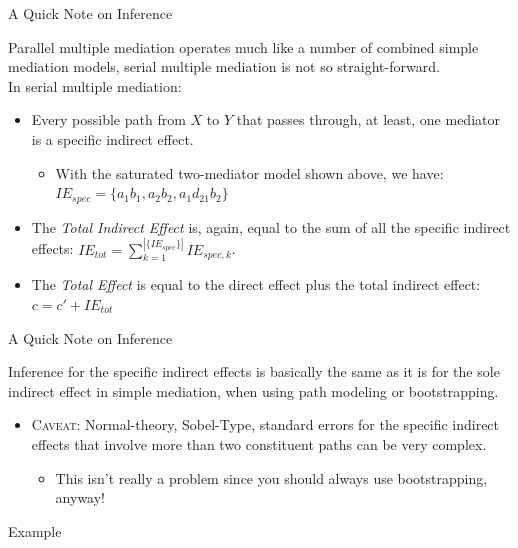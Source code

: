 \documentclass{beamer}
\newcommand{\va}[0]{\vspace{12pt}}
\newcommand{\vb}[0]{\vspace{6pt}}
\newcommand{\vc}[0]{\vspace{3pt}}
\begin{document}
\begin{frame}{A Quick Note on Inference}
  
  Parallel multiple mediation operates much like a number of combined
  simple mediation models, serial multiple mediation is not so
  straight-forward.\\ 
  \va 
  In serial multiple mediation: 
  \vb
  \begin{itemize}
  \item Every possible path from $X$ to $Y$ that passes through, at
    least, one mediator is a specific indirect effect.
    \begin{itemize}
      \item With the saturated two-mediator model shown above, we
        have: $IE_{spec} = \{a_1b_1, a_2b_2, a_1d_{21}b_2\}$
    \end{itemize}
    \vc
  \item The \emph{Total Indirect Effect} is, again, equal to the sum
    of all the specific indirect effects: $IE_{tot} = \sum_{k = 1}^{|\{IE_{spec}\}|}
    IE_{spec,k}$.  
    \vc
  \item The \emph{Total Effect} is equal to the direct effect plus the
    total indirect effect: $c = c' + IE_{tot}$
  \end{itemize}
  
\end{frame}


\begin{frame}{A Quick Note on Inference}
  
  Inference for the specific indirect effects is basically the
  same as it is for the sole indirect effect in simple mediation, when
  using path modeling or bootstrapping.  
  \va
  \begin{itemize}
  \item \textsc{Caveat:} Normal-theory, Sobel-Type, standard errors
    for the specific indirect effects that involve more than two
    constituent paths can be very complex.
    \vb
    \begin{itemize}
    \item This isn't really a problem since you should always use
      bootstrapping, anyway!
    \end{itemize}
  \end{itemize}
  
\end{frame}


\begin{frame}[allowframebreaks]{Example}
 


\end{frame}
\end{document}
